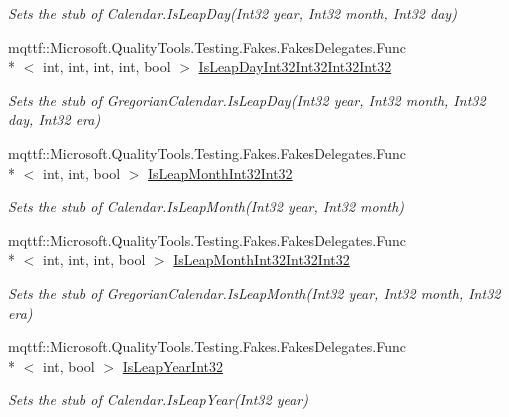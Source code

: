 \begin{DoxyCompactItemize}
\begin{DoxyCompactList}\small\item\em Sets the stub of Calendar.\-Is\-Leap\-Day(\-Int32 year, Int32 month, Int32 day)\end{DoxyCompactList}\item 
mqttf\-::\-Microsoft.\-Quality\-Tools.\-Testing.\-Fakes.\-Fakes\-Delegates.\-Func\\*
$<$ int, int, int, int, bool $>$ \hyperlink{class_system_1_1_globalization_1_1_fakes_1_1_stub_gregorian_calendar_aa51d4ee07fc7c592589da3bd70db93f2}{Is\-Leap\-Day\-Int32\-Int32\-Int32\-Int32}
\begin{DoxyCompactList}\small\item\em Sets the stub of Gregorian\-Calendar.\-Is\-Leap\-Day(\-Int32 year, Int32 month, Int32 day, Int32 era)\end{DoxyCompactList}\item 
mqttf\-::\-Microsoft.\-Quality\-Tools.\-Testing.\-Fakes.\-Fakes\-Delegates.\-Func\\*
$<$ int, int, bool $>$ \hyperlink{class_system_1_1_globalization_1_1_fakes_1_1_stub_gregorian_calendar_af66d360fdbf0cc9ce9ebfa897735b65a}{Is\-Leap\-Month\-Int32\-Int32}
\begin{DoxyCompactList}\small\item\em Sets the stub of Calendar.\-Is\-Leap\-Month(\-Int32 year, Int32 month)\end{DoxyCompactList}\item 
mqttf\-::\-Microsoft.\-Quality\-Tools.\-Testing.\-Fakes.\-Fakes\-Delegates.\-Func\\*
$<$ int, int, int, bool $>$ \hyperlink{class_system_1_1_globalization_1_1_fakes_1_1_stub_gregorian_calendar_ae21c49853011a60729f427f8c0b19943}{Is\-Leap\-Month\-Int32\-Int32\-Int32}
\begin{DoxyCompactList}\small\item\em Sets the stub of Gregorian\-Calendar.\-Is\-Leap\-Month(\-Int32 year, Int32 month, Int32 era)\end{DoxyCompactList}\item 
mqttf\-::\-Microsoft.\-Quality\-Tools.\-Testing.\-Fakes.\-Fakes\-Delegates.\-Func\\*
$<$ int, bool $>$ \hyperlink{class_system_1_1_globalization_1_1_fakes_1_1_stub_gregorian_calendar_a8a428ce56de424511a1579af7ddf916d}{Is\-Leap\-Year\-Int32}
\begin{DoxyCompactList}\small\item\em Sets the stub of Calendar.\-Is\-Leap\-Year(\-Int32 year)\end{DoxyCompactList}\item 

\end{DoxyCompactItemize}

